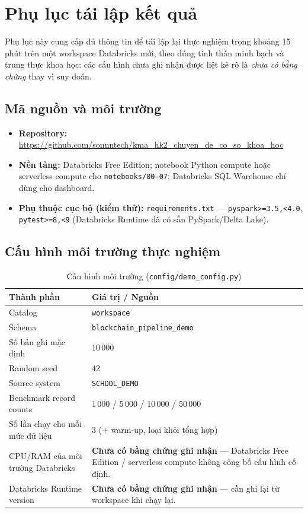 \appendices
\section{Phụ lục tái lập kết quả}\label{sec:reproducibility}

Phụ lục này cung cấp đủ thông tin để tái lập lại thực nghiệm trong
khoảng 15 phút trên một workspace Databricks mới, theo đúng tinh thần
minh bạch và trung thực khoa học: các cấu hình chưa ghi nhận được liệt
kê rõ là \emph{chưa có bằng chứng} thay vì suy đoán.

\subsection{Mã nguồn và môi trường}

\begin{itemize}
\item \textbf{Repository:} \url{https://github.com/sonnntech/kma_hk2_chuyen_de_co_so_khoa_hoc}
\item \textbf{Nền tảng:} Databricks Free Edition; notebook Python compute hoặc serverless compute cho \texttt{notebooks/00--07}; Databricks SQL Warehouse chỉ dùng cho dashboard.
\item \textbf{Phụ thuộc cục bộ (kiểm thử):} \texttt{requirements.txt} — \texttt{pyspark>=3.5,<4.0}, \texttt{pytest>=8,<9} (Databricks Runtime đã có sẵn PySpark/Delta Lake).
\end{itemize}

\subsection{Cấu hình môi trường thực nghiệm}

\begin{table}[H]
\centering
\caption{Cấu hình môi trường (\texttt{config/demo\_config.py})}
\label{tab:repro-env}
\begin{tabular}{|p{3.2cm}|p{4.5cm}|}
\hline
\textbf{Thành phần} & \textbf{Giá trị / Nguồn} \\
\hline
Catalog & \texttt{workspace} \\
\hline
Schema & \texttt{blockchain\_pipeline\_demo} \\
\hline
Số bản ghi mặc định & 10\,000 \\
\hline
Random seed & 42 \\
\hline
Source system & \texttt{SCHOOL\_DEMO} \\
\hline
Benchmark record counts & 1\,000 / 5\,000 / 10\,000 / 50\,000 \\
\hline
Số lần chạy cho mỗi mức dữ liệu & 3 (+ warm-up, loại khỏi tổng hợp) \\
\hline
CPU/RAM của môi trường Databricks & \textbf{Chưa có bằng chứng ghi nhận} — Databricks Free Edition / serverless compute không công bố cấu hình cố định. \\
\hline
Databricks Runtime version & \textbf{Chưa có bằng chứng ghi nhận} — cần ghi lại từ workspace khi chạy lại. \\
\hline
\end{tabular}
\end{table}

